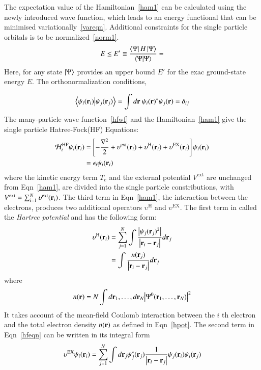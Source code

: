 The expectation value of the Hamiltonian~\eqref{ham1} can be calculated using the newly introduced wave function, which leads to an energy functional that can be minimised variationally~\eqref{vareqn}. Additional constraints for the single particle orbitals is to be normalized~\eqref{norm1}.
\begin{equation}\label{vareqn}
E \le E' \equiv \frac{\bra{\Psi}H\ket{\Psi}}{\braket{\Psi}{\Psi}} = 
\end{equation}
Here, for any state $\ket{\Psi}$ provides an upper bound $E'$ for the exac ground-state energy $E$. The orthonormalization conditions,

\begin{equation}\label{norm1}
\braket{\psi_i(\vb{r}_i)}{\psi_j(\vb{r}_j)} = \int d\vb{r}\ \psi_i(\vb{r})^{\ast} \psi_j(\vb{r}) = \delta_{ij}
\end{equation}
The many-particle wave function~\eqref{hfwf} and the Hamiltonian~\eqref{ham1} give the single particle Hatree-Fock\footnotemark (HF) Equations:
\begin{align}\label{hfeqn}
\begin{split}
\mathcal{H}_i^{\text{HF}} \psi_i(\vb{r}_i) & = \left[-\frac{\nabla^2}{2} + \upsilon^{\text{ext}}(\vb{r}_i) + \upsilon^{\text{H}}(\vb{r}_i) + \upsilon^{\text{EX}}(\vb{r}_i) \right] \psi_i(\vb{r}_i) \\
		& = \epsilon_i\psi_i(\vb{r}_i)
\end{split}
\end{align}
where the kinetic energy term $T_e$ and the external potential $V^{\text{ext}}$ are unchanged from Eqn~\eqref{ham1}, are divided into the single particle constributions, with $V^{\text{ext}} = \sum^N_{i=1}\upsilon^{\text{ext}}(\vb{r}_i)$. The third term in Eqn~\eqref{ham1}, the interaction between the electrons, produces two additional operators $\upsilon^{\text{H}}$ and $\upsilon^{\text{EX}}$. The first term in called the \textit{Hartree potential} and has the following form:
\begin{align}\label{hpot}
\begin{split}
	\upsilon^{\text{H}}(\vb{r}_i) & = \sum_{j=1}^N \int\frac{\abs{\psi_j(\vb{r}_j)^2}}{\abs{\vb{r}_i - \vb{r}_j}} d\vb{r}_j \\
     & = \int \frac{n(\vb{r}_j)}{\abs{\vb{r}_i - \vb{r}_j}} d\vb{r}_j
\end{split}
\end{align}
where
\begin{equation}\label{density}
    n(\vb{r}) = N \int d\vb{r}_1,\dots,d\vb{r}_N \abs{\Psi^0(\vb{r}_1,\dots,\vb{r}_N)}^2
\end{equation}
It takes account of the mean-field Coulomb interaction between the $i$ th electron and the total electron density $n(\vb{r})$ as defined in Eqn~\eqref{hpot}. The second term in Eqn~\eqref{hfeqn} can be written in its integral form
\begin{equation}\label{exeqn}
\upsilon^{\text{EX}}\psi_i(\vb{r}_i) = \sum_{j=1}^N \int d\vb{r}_j\psi^{\ast}_j(\vb{r}_j)\frac{1}{\abs{\vb{r}_i - \vb{r}_j}}\psi_j(\vb{r}_i)\psi_i(\vb{r}_j)
\end{equation}

